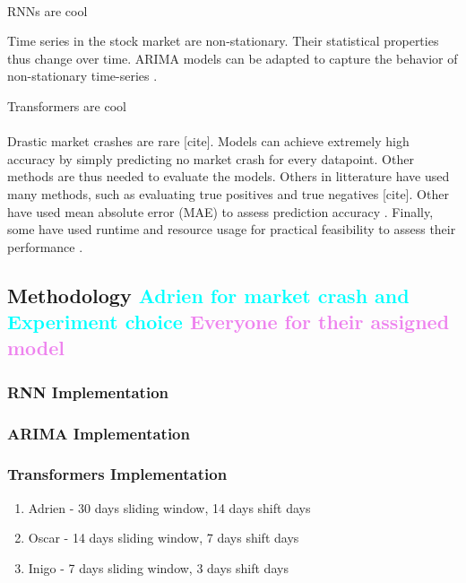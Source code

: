 \documentclass[12pt, letterpaper]{article}
\begin{document}
    \paragraph*{}
    RNNs are cool

    
    Time series in the stock market are non-stationary. Their statistical properties thus change over time. ARIMA models can be adapted to capture the behavior of non-stationary time-series \cite{ho2021}.

    Transformers are cool

    
    \paragraph*{}
    Drastic market crashes are rare [cite]. Models can achieve extremely high accuracy by simply predicting no market crash for every datapoint. Other methods are thus needed to evaluate the models. Others in litterature have used many methods, such as evaluating true positives and true negatives [cite]. Other have used mean absolute error (MAE) to assess prediction accuracy \cite{hyndman2018}. Finally, some have used runtime and resource usage for practical feasibility to assess their performance \cite{lim2021temporal}.

\subsection*{Methodology \textcolor{cyan}{Adrien for market crash and Experiment choice} \textcolor{violet}{Everyone for their assigned model}}

\subsubsection*{RNN Implementation}

\subsubsection*{ARIMA Implementation}

\subsubsection*{Transformers Implementation}
    \begin{enumerate}
        \item Adrien - 30 days sliding window, 14 days shift days
        \item Oscar - 14 days sliding window, 7 days shift days
        \item Inigo - 7 days sliding window, 3 days shift days
    \end{enumerate}
\end{document}
